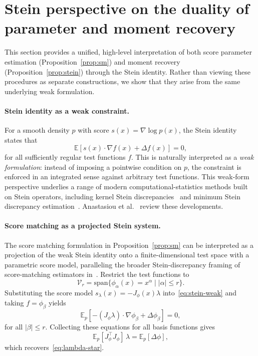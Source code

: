 \documentclass{article}
\newcommand{\E}{\mathbb{E}}
\theoremstyle{definition}
\begin{document}
\section{Stein perspective on the duality of parameter and moment recovery}
\label{app:stein-duality}

This section provides a unified, high-level interpretation of both score parameter estimation (Proposition~\ref{prop:sm}) and moment recovery (Proposition~\ref{prop:stein}) through the Stein identity. Rather than viewing these procedures as separate constructions, we show that they arise from the same underlying weak formulation.

\paragraph{Stein identity as a weak constraint.}
For a smooth density $p$ with score $s(x) = \nabla \log p(x)$, the Stein identity~\cite{stein1972} states that
\begin{equation}\label{eq:stein-weak}
    \E[s(x) \cdot \nabla f(x) + \Delta f(x)] = 0,
\end{equation}
for all sufficiently regular test functions $f$. This is naturally interpreted as a \emph{weak formulation}: instead of imposing a pointwise condition on $p$, the constraint is enforced in an integrated sense against arbitrary test functions. This weak-form perspective underlies a range of modern computational-statistics methods built on Stein operators, including kernel Stein discrepancies~\cite{gorham2015} and minimum Stein discrepancy estimation~\cite{barp2019}. Anastasiou et al.~\cite{anastasiou2023} review these developments.

\paragraph{Score matching as a projected Stein system.}
The score matching formulation in Proposition~\ref{prop:sm} can be interpreted as a projection of the weak Stein identity onto a finite-dimensional test space with a parametric score model, paralleling the broader Stein-discrepancy framing of score-matching estimators in~\cite{barp2019,kume2026}. Restrict the test functions to
\[
    \mathcal{V}_r = \mathrm{span}\{\phi_\alpha(x) = x^\alpha \mid |\alpha| \le r\}.
\]
Substituting the score model $s_\lambda(x) = -J_\phi(x)\lambda$ into~\eqref{eq:stein-weak} and taking $f = \phi_\beta$ yields
\[
    \E_p\!\left[ -(J_\phi \lambda) \cdot \nabla \phi_\beta + \Delta \phi_\beta \right] = 0,
\]
for all $|\beta| \le r$. Collecting these equations for all basis functions gives
\[
    \E_p[J_\phi^\top J_\phi]\, \lambda = \E_p[\Delta \phi],
\]
which recovers~\eqref{eq:lambda-star}.
\end{document}
